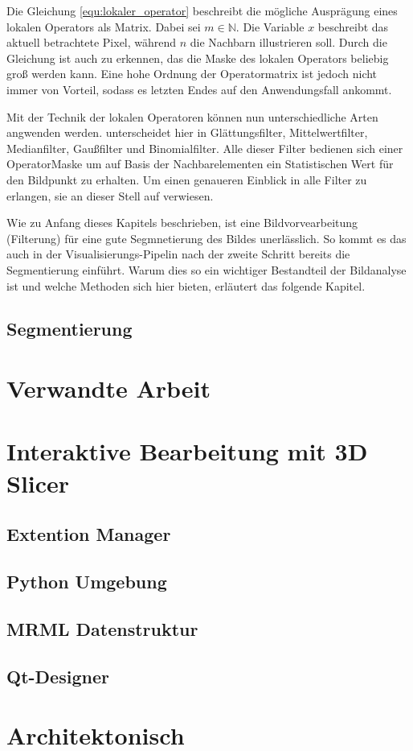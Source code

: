 Die Gleichung \ref{equ:lokaler_operator} beschreibt die mögliche Ausprägung eines
lokalen Operators als Matrix. Dabei sei $m \in \mathbb{N}$. Die Variable $x$ beschreibt
das aktuell betrachtete Pixel, während $n$ die Nachbarn illustrieren soll. Durch
die Gleichung ist auch zu erkennen, das die Maske des lokalen Operators beliebig
groß werden kann. Eine hohe Ordnung der Operatormatrix ist jedoch nicht immer von
Vorteil, sodass es letzten Endes auf den Anwendungsfall ankommt.

Mit der Technik der lokalen Operatoren können nun unterschiedliche Arten
angwenden werden. \citet[Seite 54 - 55]{handels2000} unterscheidet hier in Glättungsfilter,
Mittelwertfilter, Medianfilter, Gaußfilter und Binomialfilter. Alle dieser Filter
bedienen sich einer OperatorMaske um auf Basis der Nachbarelementen ein Statistischen
Wert für den Bildpunkt zu erhalten. Um einen genaueren Einblick in alle Filter
zu erlangen, sie an dieser Stell auf \citet[Seite 54 - 55]{handels2000} verwiesen.

Wie zu Anfang dieses Kapitels beschrieben, ist eine Bildvorvearbeitung (Filterung)
für eine gute Segmnetierung des Bildes unerlässlich. So kommt es das auch in der
Visualisierungs-Pipelin nach \citet[Seite 50]{handels2000} der zweite Schritt bereits
die Segmentierung einführt. Warum dies so ein wichtiger Bestandteil der
Bildanalyse ist und welche Methoden sich hier bieten, erläutert das folgende Kapitel.

\subsection{Segmentierung}
\label{subsec:segmentierung}

\section{Verwandte Arbeit}
\label{sec:verwwandte_arbeit}

\section{Interaktive Bearbeitung mit 3D Slicer}
\label{sec:3d_slicer}
\subsection{Extention Manager}
\subsection{Python Umgebung}
\subsection{MRML Datenstruktur}
\subsection{Qt-Designer}

\section{Architektonisch}
\label{sec:architektonisch}